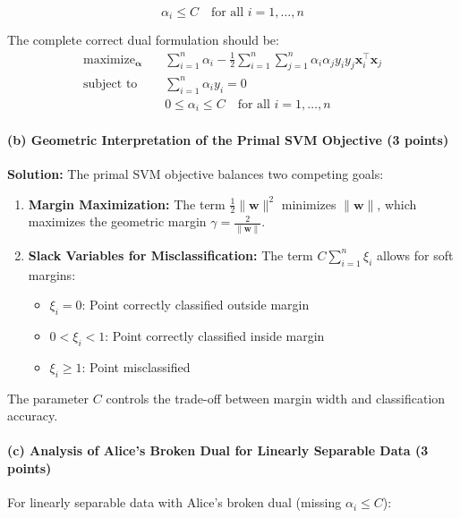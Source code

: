 \documentclass[12pt,a4paper]{article}
\DeclareMathOperator*{\maximize}{maximize}
\theoremstyle{definition}
\begin{document}
\begin{equation}
\boxed{\alpha_i \leq C \quad \text{for all } i = 1,\ldots,n}
\end{equation}

The complete correct dual formulation should be:
\begin{align}
\maximize_{\bm{\alpha}} \quad &\sum_{i=1}^n \alpha_i - \frac{1}{2}\sum_{i=1}^n\sum_{j=1}^n \alpha_i\alpha_j y_i y_j \mathbf{x}_i^\top \mathbf{x}_j\\
\text{subject to} \quad &\sum_{i=1}^n \alpha_i y_i = 0\\
&0 \leq \alpha_i \leq C \quad \text{for all } i = 1,\ldots,n
\end{align}

\paragraph{(b) Geometric Interpretation of the Primal SVM Objective (3 points)}

\textbf{Solution:} The primal SVM objective balances two competing goals:

\begin{enumerate}[label=(\roman*)]
\item \textbf{Margin Maximization:} The term $\frac{1}{2}\|\mathbf{w}\|^2$ minimizes $\|\mathbf{w}\|$, which maximizes the geometric margin $\gamma = \frac{2}{\|\mathbf{w}\|}$. 

\item \textbf{Slack Variables for Misclassification:} The term $C\sum_{i=1}^n \xi_i$ allows for soft margins:
   \begin{itemize}
   \item $\xi_i = 0$: Point correctly classified outside margin
   \item $0 < \xi_i < 1$: Point correctly classified inside margin
   \item $\xi_i \geq 1$: Point misclassified
   \end{itemize}
\end{enumerate}

The parameter $C$ controls the trade-off between margin width and classification accuracy.

\paragraph{(c) Analysis of Alice's Broken Dual for Linearly Separable Data (3 points)}

For linearly separable data with Alice's broken dual (missing $\alpha_i \leq C$):
\end{document}
